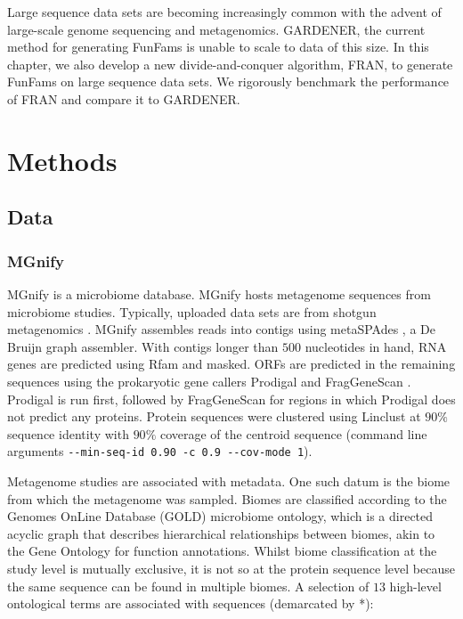 Large sequence data sets are becoming increasingly common with the advent of large-scale genome sequencing and metagenomics. GARDENER, the current method for generating FunFams is unable to scale to data of this size. In this chapter, we also develop a new divide-and-conquer algorithm, FRAN, to generate FunFams on large sequence data sets. We rigorously benchmark the performance of FRAN and compare it to GARDENER.


\section{Methods}

\subsection{Data}

\subsubsection{MGnify}
\label{sec:mgnify-methods}

MGnify \cite{Mitchell2020} is a microbiome database. MGnify hosts metagenome sequences from microbiome studies. Typically, uploaded data sets are from shotgun metagenomics \cite{Quince2017}. MGnify assembles reads into contigs using metaSPAdes \cite{Nurk2017}, a De Bruijn graph assembler. With contigs longer than $500$ nucleotides in hand, RNA genes are predicted using Rfam \cite{Kalvari2018} and masked. ORFs are predicted in the remaining sequences using the prokaryotic gene callers Prodigal \cite{Hyatt2010} and FragGeneScan \cite{Ismail2014}. Prodigal is run first, followed by FragGeneScan for regions in which Prodigal does not predict any proteins. Protein sequences were clustered using Linclust at $90\%$ sequence identity with $90\%$ coverage of the centroid sequence (command line arguments \texttt{-\/-min-seq-id\ 0.90\ -c\ 0.9\ -\/-cov-mode\ 1}).

Metagenome studies are associated with metadata. One such datum is the biome from which the metagenome was sampled. Biomes are classified according to the Genomes OnLine Database (GOLD) \cite{Mukherjee2019} microbiome ontology, which is a directed acyclic graph that describes hierarchical relationships between biomes, akin to the Gene Ontology for function annotations. Whilst biome classification at the study level is mutually exclusive, it is not so at the protein sequence level because the same sequence can be found in multiple biomes. A selection of $13$ high-level ontological terms are associated with sequences (demarcated by *):


